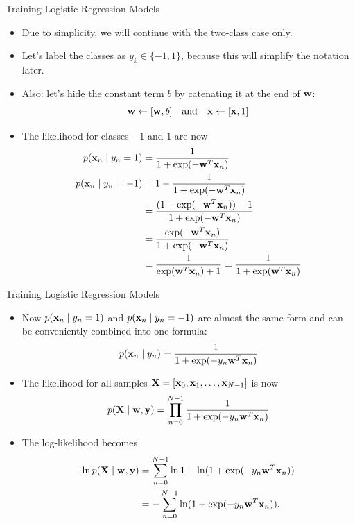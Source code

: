 \documentclass[10pt, aspectratio=169]{beamer} %
\newcommand{\w}{{\bf w}}
\newcommand{\X}{{\bf X}}
\newcommand{\x}{{\bf x}}
\newcommand{\y}{{\bf y}}
\begin{document}
\begin{frame}[allowframebreaks]{Training Logistic Regression Models}
\begin{itemize}
\item Due to simplicity, we will continue with the two-class case only.
\item Let's label the classes as $y_k\in\{-1,1\}$, because this will simplify the notation later.
\item Also: let's hide the constant term $b$ by catenating it at the end of $\w$:
\[
\w \leftarrow [\w, b]\quad\text{and}\quad \x \leftarrow [\x, 1]
\]
\item The likelihood for classes $-1$ and $1$ are now
\begin{align*}
p(\x_n \mid y_n = 1) &= \frac{1}{1 + \exp(-\w^T\x_n)}\\
p(\x_n \mid y_n = -1) &= 1-\frac{1}{1 + \exp(-\w^T\x_n)}\\
&= \frac{(1 + \exp(-\w^T\x_n)) - 1}{1 + \exp(-\w^T\x_n)}\\
&= \frac{\exp(-\w^T\x_n)}{1 + \exp(-\w^T\x_n)}\\
&= \frac{1}{\exp(\w^T\x_n) + 1}
= \frac{1}{1 + \exp(\w^T\x_n)}
\end{align*}
\end{itemize}
\end{frame}

\begin{frame}[allowframebreaks]{Training Logistic Regression Models}
\begin{itemize}
\item Now $p(\x_n \mid y_n = 1)$ and $p(\x_n \mid y_n = -1)$ are almost the same form
and can be conveniently combined into one formula:
\[
p(\x_n \mid y_n) = \frac{1}{1 + \exp(-y_n\w^T\x_n)}
\]
\item The likelihood for all samples $\X = [\x_0, \x_1, \ldots, \x_{N-1}]$ is now
\[
p(\X \mid \w, \y) = \prod_{n = 0}^{N-1} \frac{1}{1 + \exp(-y_n\w^T\x_n)}
\]
\item The log-likelihood becomes
\begin{align*}
\ln p(\X \mid \w, \y) &= \sum_{n = 0}^{N-1} \ln 1 - \ln(1 + \exp(-y_n\w^T\x_n))\\
&= -\sum_{n = 0}^{N-1} \ln(1 + \exp(-y_n\w^T\x_n)).
\end{align*}
\end{itemize}
\end{frame}
\end{document}

